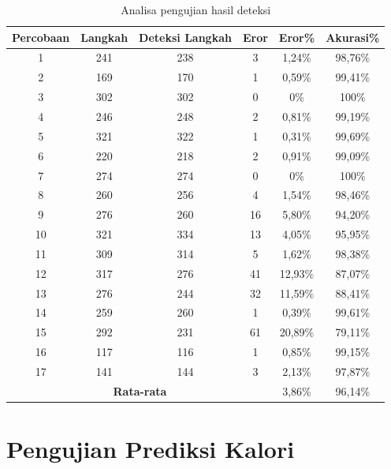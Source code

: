 \begin{longtable}{|c|c|c|c|c|c|}
  \caption{Analisa pengujian hasil deteksi}
  \label{tb:AnalisaDeteksi}                                   \\
  \hline
  \rowcolor[HTML]{C0C0C0}
  \textbf{Percobaan} & \textbf{Langkah} & \textbf{Deteksi Langkah} & \textbf{Eror} & \textbf{Eror\%} & \textbf{Akurasi\%} \\
  \hline
  1   & 241   & 238   & 3    & 1,24\%    & 98,76\%   \\
  \hline
  2   & 169   & 170   & 1    & 0,59\%    & 99,41\%   \\
  \hline
  3   & 302   & 302   & 0    & 0\%       & 100\%     \\
  \hline
  4   & 246   & 248   & 2    & 0,81\%    & 99,19\%   \\
  \hline
  5   & 321   & 322   & 1    & 0,31\%    & 99,69\%   \\
  \hline
  6   & 220   & 218   & 2    & 0,91\%    & 99,09\%   \\
  \hline
  7   & 274   & 274   & 0    & 0\%       & 100\%   \\
  \hline
  8   & 260   & 256   & 4    & 1,54\%    & 98,46\%   \\
  \hline
  9   & 276   & 260   & 16   & 5,80\%    & 94,20\%   \\
  \hline
  10   & 321   & 334  & 13   & 4,05\%    & 95,95\%   \\
  \hline
  11   & 309   & 314  & 5    & 1,62\%    & 98,38\%   \\
  \hline
  12   & 317   & 276  & 41   & 12,93\%   & 87,07\%   \\
  \hline
  13   & 276   & 244  & 32   & 11,59\%   & 88,41\%   \\
  \hline
  14   & 259   & 260  & 1    & 0,39\%    & 99,61\%   \\
  \hline
  15   & 292   & 231  & 61   & 20,89\%   & 79,11\%   \\
  \hline
  16   & 117   & 116  & 1    & 0,85\%    & 99,15\%   \\
  \hline
  17   & 141   & 144  & 3    & 2,13\%    & 97,87\%   \\
  \hline

  \multicolumn{4}{|c|}{\textbf{Rata-rata}} & 3,86\% & 96,14\% \\
  \hline
\end{longtable}


\section{Pengujian Prediksi Kalori}
\label{sec:PengujianPrediksi}

